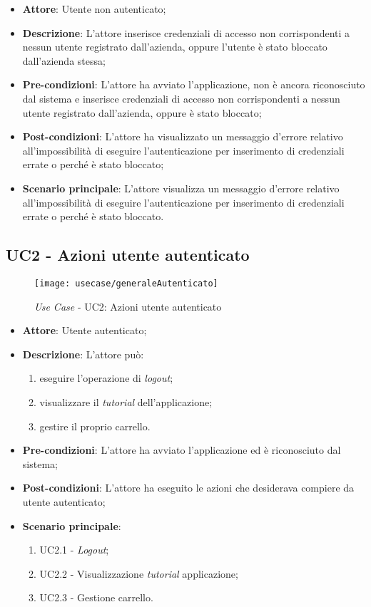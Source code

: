 \begin{itemize}
	\item \textbf{Attore}: Utente non autenticato;
	\item \textbf{Descrizione}: L'attore inserisce credenziali di accesso non corrispondenti a nessun utente registrato dall'azienda, oppure l'utente è stato bloccato dall'azienda stessa;
	\item \textbf{Pre-condizioni}: L'attore ha avviato l'applicazione, non è ancora riconosciuto dal sistema e inserisce credenziali di accesso non corrispondenti a nessun utente registrato dall'azienda, oppure è stato bloccato;
	\item \textbf{Post-condizioni}: L'attore ha visualizzato un messaggio d'errore relativo all'impossibilità di eseguire l'autenticazione per inserimento di credenziali errate o perché è stato bloccato;
	\item \textbf{Scenario principale}: L'attore visualizza un messaggio d'errore relativo all'impossibilità di eseguire l'autenticazione per inserimento di credenziali errate o perché è stato bloccato.
\end{itemize}

\newpage

\subsection{UC2 - Azioni utente autenticato}

\begin{figure}[!h] 
    \centering 
    \texttt{[image: usecase/generaleAutenticato]} 
    \caption{\textit{Use Case} - UC2: Azioni utente autenticato}
\end{figure}

\begin{itemize}
	\item \textbf{Attore}: Utente autenticato;
	\item \textbf{Descrizione}: L'attore può:
	\begin{enumerate}
		\item eseguire l'operazione di \textit{logout};
		\item visualizzare il \textit{tutorial} dell'applicazione;
		\item gestire il proprio carrello. 
	\end{enumerate}
	\item \textbf{Pre-condizioni}: L'attore ha avviato l'applicazione ed è riconosciuto dal sistema;
	\item \textbf{Post-condizioni}: L'attore ha eseguito le azioni che desiderava compiere da utente autenticato;
	\item \textbf{Scenario principale}: 
		\begin{enumerate}
			\item UC2.1 - \textit{Logout};
			\item UC2.2 - Visualizzazione \textit{tutorial} applicazione;
			\item UC2.3 - Gestione carrello.
		\end{enumerate}
\end{itemize}


